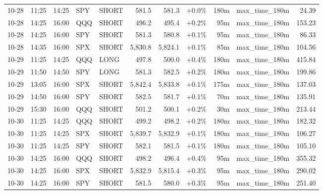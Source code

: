 \documentclass[11pt,a4paper,twoside]{article}
\begin{document}
\begin{center}
\begin{longtable}{>{\color{txtmain}}l l l l l r r r r >{\color{txtmain}}l r}
10-28 & 11:25 & 14:25 & SPY & SHORT & 581.5 & 581.3 & \textcolor{wingreen}{+0.0\%} & 180m & max\_time\_180m & \textcolor{wingreen}{24.39} \\
10-28 & 14:25 & 16:00 & QQQ & SHORT & 496.2 & 495.4 & \textcolor{wingreen}{+0.2\%} & 95m & max\_time\_180m & \textcolor{wingreen}{153.23} \\
10-28 & 14:25 & 16:00 & SPY & SHORT & 581.3 & 580.8 & \textcolor{wingreen}{+0.1\%} & 95m & max\_time\_180m & \textcolor{wingreen}{86.33} \\
10-28 & 14:35 & 16:00 & SPX & SHORT & 5,830.8 & 5,824.1 & \textcolor{wingreen}{+0.1\%} & 85m & max\_time\_180m & \textcolor{wingreen}{104.56} \\
10-29 & 11:25 & 14:25 & QQQ & LONG & 497.8 & 500.0 & \textcolor{wingreen}{+0.4\%} & 180m & max\_time\_180m & \textcolor{wingreen}{415.84} \\
10-29 & 11:50 & 14:50 & SPY & LONG & 581.3 & 582.5 & \textcolor{wingreen}{+0.2\%} & 180m & max\_time\_180m & \textcolor{wingreen}{199.86} \\
10-29 & 13:05 & 16:00 & SPX & SHORT & 5,842.4 & 5,833.8 & \textcolor{wingreen}{+0.1\%} & 175m & max\_time\_180m & \textcolor{wingreen}{137.03} \\
10-29 & 14:50 & 16:00 & SPY & SHORT & 582.5 & 581.7 & \textcolor{wingreen}{+0.1\%} & 70m & max\_time\_180m & \textcolor{wingreen}{135.91} \\
10-29 & 15:30 & 16:00 & QQQ & SHORT & 501.2 & 500.1 & \textcolor{wingreen}{+0.2\%} & 30m & max\_time\_180m & \textcolor{wingreen}{213.44} \\
10-30 & 11:25 & 14:25 & QQQ & SHORT & 499.2 & 498.2 & \textcolor{wingreen}{+0.2\%} & 180m & max\_time\_180m & \textcolor{wingreen}{182.32} \\
10-30 & 11:25 & 14:25 & SPX & SHORT & 5,839.7 & 5,832.9 & \textcolor{wingreen}{+0.1\%} & 180m & max\_time\_180m & \textcolor{wingreen}{106.27} \\
10-30 & 11:25 & 14:25 & SPY & SHORT & 582.1 & 581.5 & \textcolor{wingreen}{+0.1\%} & 180m & max\_time\_180m & \textcolor{wingreen}{105.10} \\
10-30 & 14:25 & 16:00 & QQQ & SHORT & 498.2 & 496.4 & \textcolor{wingreen}{+0.4\%} & 95m & max\_time\_180m & \textcolor{wingreen}{355.32} \\
10-30 & 14:25 & 16:00 & SPX & SHORT & 5,832.9 & 5,815.4 & \textcolor{wingreen}{+0.3\%} & 95m & max\_time\_180m & \textcolor{wingreen}{290.02} \\
10-30 & 14:25 & 16:00 & SPY & SHORT & 581.5 & 580.0 & \textcolor{wingreen}{+0.3\%} & 95m & max\_time\_180m & \textcolor{wingreen}{251.40} \\

\end{longtable}
\end{center}
\end{document}
